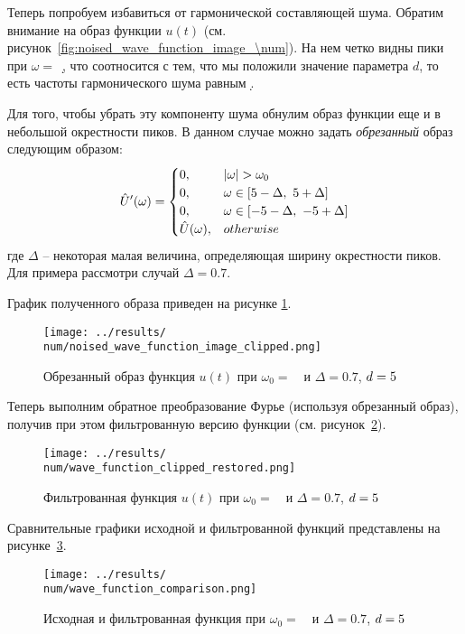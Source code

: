 \FloatBarrier
Теперь попробуем избавиться от гармонической составляющей шума. 
Обратим внимание на образ функции $u(t)$ (см. рисунок~\ref{fig:noised_wave_function_image_\num}).
На нем четко видны пики при $\omega = $~\d, что соотносится с тем, что мы положили значение параметра $d$, то есть частоты гармонического шума равным \d.

Для того, чтобы убрать эту компоненту шума обнулим образ функции еще и в небольшой окрестности пиков. В данном случае можно задать \textit{обрезанный} образ 
следующим образом: 
\begin{equation}
    \hat{U}'(\omega) = \begin{cases}
        0, & |\omega| > \omega_0 \\
        0, & \omega \in [5 - \Delta,~5 + \Delta] \\
        0, & \omega \in [-5 - \Delta,~-5 + \Delta] \\
        \hat{U}(\omega), & otherwise
    \end{cases}
\end{equation}
где $\Delta$ -- некоторая малая величина, определяющая ширину окрестности пиков.
Для примера рассмотри случай $\Delta = 0.7$.

\def\num{10}
График полученного образа приведен на рисунке \ref{fig:noised_wave_function_image_clipped_\num}.

\begin{figure}[ht!]
    \centering
    \texttt{[image: ../results/\\num/noised\_wave\_function\_image\_clipped.png]}
    \caption{Обрезанный образ функция $u(t)$ при $\omega_0=$~\imageclip~и $\Delta = 0.7$, $d = 5$}
    \label{fig:noised_wave_function_image_clipped_\num}
\end{figure}

Теперь выполним обратное преобразование Фурье (используя обрезанный образ), получив при этом фильтрованную версию функции (см. рисунок~\ref{fig:wave_function_clipped_restored_\num}).

\begin{figure}[ht!]
    \centering
    \texttt{[image: ../results/\\num/wave\_function\_clipped\_restored.png]}
    \caption{Фильтрованная функция $u(t)$ при $\omega_0=$~\imageclip~и $\Delta = 0.7$, $d = 5$}
    \label{fig:wave_function_clipped_restored_\num}
\end{figure}

Сравнительные графики исходной и фильтрованной функций представлены на рисунке~\ref{fig:wave_function_comparison_\num}. 
\begin{figure}[ht!]
    \centering
    \texttt{[image: ../results/\\num/wave\_function\_comparison.png]}
    \caption{Исходная и фильтрованная функция при $\omega_0=$~\imageclip~и $\Delta = 0.7$, $d = 5$}
    \label{fig:wave_function_comparison_\num}
\end{figure}

